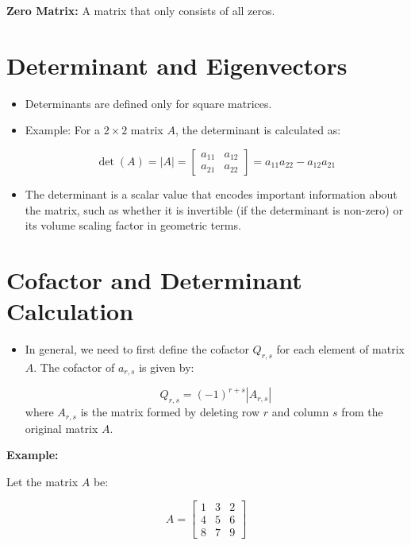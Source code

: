 \documentclass{article}
\begin{document}
\textbf{Zero Matrix:} A matrix that only consists of all zeros.





\section{Determinant and Eigenvectors}

\begin{itemize}
    \item Determinants are defined only for square matrices.

    \item Example: For a \( 2 \times 2 \) matrix \( A \), the determinant is calculated as:

    \[
    \det(A) = \left| A \right| = \begin{bmatrix}
    a_{11} & a_{12} \\
    a_{21} & a_{22}
    \end{bmatrix}
    = a_{11}a_{22} - a_{12}a_{21}
    \]

    \item The determinant is a scalar value that encodes important information about the matrix, such as whether it is invertible (if the determinant is non-zero) or its volume scaling factor in geometric terms.
\end{itemize}

\section{Cofactor and Determinant Calculation}

\begin{itemize}
    \item In general, we need to first define the cofactor \( Q_{r,s} \) for each element of matrix \( A \). The cofactor of \( a_{r,s} \) is given by:

    \[
    Q_{r,s} = (-1)^{r+s} \left| A_{r,s} \right|
    \]
    where \( A_{r,s} \) is the matrix formed by deleting row \( r \) and column \( s \) from the original matrix \( A \).
\end{itemize}

\textbf{Example:}

Let the matrix \( A \) be:

\[
A = \begin{bmatrix}
1 & 3 & 2 \\
4 & 5 & 6 \\
8 & 7 & 9
\end{bmatrix}
\]
\end{document}
